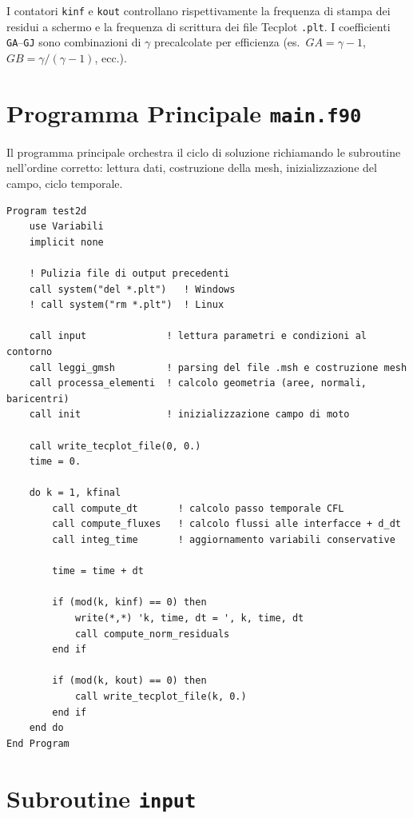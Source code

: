 I contatori \texttt{kinf} e \texttt{kout} controllano rispettivamente la
frequenza di stampa dei residui a schermo e la frequenza di scrittura dei
file Tecplot \texttt{.plt}.
I coefficienti \texttt{GA}--\texttt{GJ} sono combinazioni di $\gamma$
precalcolate per efficienza (es.\ $GA = \gamma - 1$, $GB = \gamma/(\gamma-1)$,
ecc.).

\section{Programma Principale \texttt{main.f90}}

Il programma principale orchestra il ciclo di soluzione richiamando le
subroutine nell'ordine corretto: lettura dati, costruzione della mesh,
inizializzazione del campo, ciclo temporale.

\begin{lstlisting}[style=fortran]
Program test2d
    use Variabili
    implicit none

    ! Pulizia file di output precedenti
    call system("del *.plt")   ! Windows
    ! call system("rm *.plt")  ! Linux

    call input              ! lettura parametri e condizioni al contorno
    call leggi_gmsh         ! parsing del file .msh e costruzione mesh
    call processa_elementi  ! calcolo geometria (aree, normali, baricentri)
    call init               ! inizializzazione campo di moto

    call write_tecplot_file(0, 0.)
    time = 0.

    do k = 1, kfinal
        call compute_dt       ! calcolo passo temporale CFL
        call compute_fluxes   ! calcolo flussi alle interfacce + d_dt
        call integ_time       ! aggiornamento variabili conservative

        time = time + dt

        if (mod(k, kinf) == 0) then
            write(*,*) 'k, time, dt = ', k, time, dt
            call compute_norm_residuals
        end if

        if (mod(k, kout) == 0) then
            call write_tecplot_file(k, 0.)
        end if
    end do
End Program
\end{lstlisting}

\section{Subroutine \texttt{input}}

